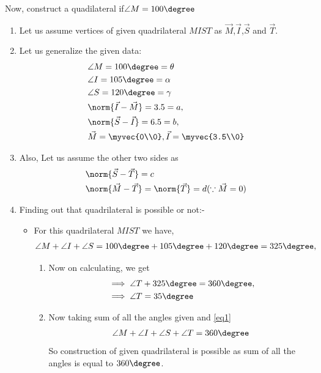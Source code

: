 \documentclass[journal,12pt,twocolumn]{IEEEtran}
\begin{document}
Now, construct a quadilateral if$\angle M=100\degree$
\begin{enumerate}
\item Let us assume vertices of given quadrilateral $MIST$ as $\vec{M}$,$\vec{I}$,$\vec{S}$ and $\vec{T}$.
\item Let us generalize the given data:
    \begin{align}
    &\angle M= 100\degree=\theta \label{eq1}
    \\
    &\angle I= 105\degree=\alpha
    \\
    &\angle S= 120\degree=\gamma \label{eq2}
    \\
    &\norm{\vec{I}-\vec{M}} =3.5=a, \label{eq3}
    \\
    &\norm{\vec{S}-\vec{I}} =6.5=b,\label{eq4}
    \\
    &\vec{M}=\myvec{0\\0}, \vec{I}=\myvec{3.5\\0}
    \end{align}
\item Also, Let us assume the other two sides as
\begin{align}
 &\norm{\vec{S}-\vec{T}}=c \label{eq5}
 \\
  &\norm{\vec{M}-\vec{T}}=\norm{\vec{T}} =d \label{eq6} (\because \vec{M}=0)
\end{align} 
\item Finding out that quadrilateral is possible or not:-
\begin{itemize}
\item For this quadrilateral $MIST$ we have,
\begin{align}
\angle M +\angle I +\angle S=100\degree + 105\degree+120\degree =325\degree,
\end{align}
    \begin{enumerate}
    \item Now on calculating, we get
\begin{align}
&\implies \angle T + 325\degree  = 360\degree,
\\
&\implies \angle T = 35\degree\label{eq1}
\end{align}
 \item Now taking sum of all the angles given and \eqref{eq1}  
\begin{align}
\angle M + \angle I +\angle S +\angle T =360\degree
\end{align}
So construction of given quadrilateral is possible as sum of all the angles is equal to $360\degree$.
\\

\end{enumerate}
\end{itemize}
\end{enumerate}
\end{document}
